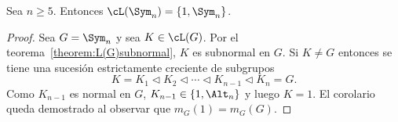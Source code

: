 \begin{corollary}
	Sea $n\geq5$. Entonces $\cL(\Sym_n)=\{1,\Sym_n\}$. 
\end{corollary}

\begin{proof}
	Sea $G=\Sym_n$ y sea $K\in\cL(G)$. Por el
	teorema~\ref{theorem:L(G)subnormal}, $K$ es subnormal en $G$. Si $K\ne G$
	entonces se tiene una sucesión estrictamente creciente de subgrupos 
	\[
	K=K_1\triangleleft
	K_2\triangleleft\cdots\triangleleft K_{n-1}\triangleleft K_n=G.
	\]
	Como $K_{n-1}$ es normal en $G$, $K_{n-1}\in\{1,\Alt_n\}$ y luego $K=1$. 
	El corolario queda demostrado al observar que $m_G(1)=m_G(G)$. 
\end{proof}

